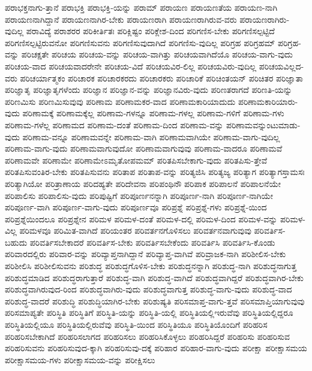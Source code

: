 {ಪರಾಭಕ್ತನಾಗು-ತ್ತಾನೆ
ಪರಾಭಕ್ತಿ
ಪರಾಭಕ್ತಿ-ಯನ್ನು
ಪರಾಮ್
ಪರಾಯಣ
ಪರಾಯಣತೆಯ
ಪರಾಯಣ-ನಾಗಿ
ಪರಾಯಣನಾಗಿದ್ದಾನೆ
ಪರಾಯಣನಾಗಿರ-ಬೇಕು
ಪರಾಯಣರಾಗಿ
ಪರಾಯಣರಾಗಿರುವ-ವರು
ಪರಾಯಣರಾಗಿರು-ವುದಿಲ್ಲ
ಪರಾವಿದ್ಯೆ
ಪರಾಶರರ
ಪರಿಕೀರ್ತಿತಃ
ಪರಿಕ್ಲಿಷ್ಟಂ
ಪರಿಕ್ಲೇಶ-ದಿಂದ
ಪರಿಗಣಿಸ-ಬೇಕು
ಪರಿಗಣಿಸಲ್ಪಟ್ಟಿದೆ
ಪರಿಗಣಿಸಲ್ಪಟ್ಟಿರುವನೋ
ಪರಿಗಣಿಸುವನು
ಪರಿಗಣಿಸುವುದಾಗಿದೆ
ಪರಿಗಣಿಸು-ವುದಿಲ್ಲ
ಪರಿಗ್ರಹ
ಪರಿಗ್ರಹಮ್
ಪರಿಗ್ರಹ-ವನ್ನು
ಪರಿಚಕ್ಷತೇ
ಪರಿಚಯ
ಪರಿಚಯ-ವನ್ನು
ಪರಿಚಯ-ವಾಗಿತ್ತು
ಪರಿಚಯವಾಗಿದೆಯೊ
ಪರಿಚಯ-ವಾಗು-ವುದು
ಪರಿಚಯ-ವಾದ
ಪರಿಚಯವಾದರೇನೇ
ಪರಿಚಯ-ವಿದೆ
ಪರಿಚಯವಿರ-ಲಿಲ್ಲ
ಪರಿಚಯವಿರು-ವುದಿಲ್ಲ
ಪರಿಚಯವಿಲ್ಲದ-ವರು
ಪರಿಚರ್ಯಾತ್ಮಕಂ
ಪರಿಚಾರಕ
ಪರಿಚಾರಕರದು
ಪರಿಚಾರಕರು
ಪರಿಚಾರಿಕೆ
ಪರಿಚಿಂತಯನ್
ಪರಿಚಿತರ
ಪರಿಜ್ಞಾತಾ
ಪರಿಜ್ಞಾತೃ
ಪರಿಜ್ಞಾತೃಗಳೆಂದು
ಪರಿಜ್ಞಾನ
ಪರಿಜ್ಞಾನ-ವನ್ನು
ಪರಿಜ್ಞಾನವಿರು-ವುದು
ಪರಿಣತರಾಗದೆ
ಪರಿಣತಿ-ಯನ್ನು
ಪರಿಣಮಿಸು
ಪರಿಣಮಿಸುವುವು
ಪರಿಣಾಮ
ಪರಿಣಾಮಕರ-ವಾದ
ಪರಿಣಾಮಕಾರಿಯಾದುದು
ಪರಿಣಾಮಕಾರಿಯಾರು-ವುದು
ಪರಿಣಾಮಕ್ಕೆ
ಪರಿಣಾಮಕ್ಕೆಲ್ಲ
ಪರಿಣಾಮ-ಗಳನ್ನೂ
ಪರಿಣಾಮ-ಗಳಲ್ಲ
ಪರಿಣಾಮ-ಗಳಿಗೆ
ಪರಿಣಾಮ-ಗಳು
ಪರಿಣಾಮ-ಗಳೆಲ್ಲ
ಪರಿಣಾಮದ
ಪರಿಣಾಮ-ದಂತೆ
ಪರಿಣಾಮ-ದಿಂದ
ಪರಿಣಾಮ-ವನ್ನು
ಪರಿಣಾಮವನ್ನುಂಟುಮಾಡು-ವುದು
ಪರಿಣಾಮ-ವನ್ನೂ
ಪರಿಣಾಮವನ್ನೇ
ಪರಿಣಾಮ-ವಾಗಿ
ಪರಿಣಾಮವಾಗಿಯೇ
ಪರಿಣಾಮ-ವಾಗು-ವುದಿಲ್ಲ
ಪರಿಣಾಮ-ವಾಗು-ವುದು
ಪರಿಣಾಮವಾಗುವುದೋ
ಪರಿಣಾಮವಾಗುವುವು
ಪರಿಣಾಮ-ವಾದರೂ
ಪರಿಣಾಮವೆ
ಪರಿಣಾಮವೇ
ಪರಿಣಾಮೇ
ಪರಿಣಾಮೇಽಮೃತೋಪಮಮ್
ಪರಿತಪಿಸಬೇಕಾಗು-ವುದು
ಪರಿತಪಿಸು-ತ್ತೇವೆ
ಪರಿತಪಿಸುವಂತಿರ-ಬೇಕು
ಪರಿತಪಿಸುವನು
ಪರಿತಾಪ
ಪರಿತಾಪ-ವನ್ನು
ಪರಿತ್ಯಜಿಸಿ
ಪರಿತ್ಯಜ್ಯ
ಪರಿತ್ಯಾಗ
ಪರಿತ್ಯಾಗಸ್ತಾಮಸಃ
ಪರಿತ್ಯಾಗಿಯೋ
ಪರಿತ್ರಾಣಾಯ
ಪರಿದಹ್ಯತೇ
ಪರಿದೇವನಾ
ಪರಿಪಂಥಿನೌ
ಪರಿಪಾಕ
ಪರಿಪಾಲನೆ
ಪರಿಪಾಲನೆಯೇ
ಪರಿಪಾಲಿಸು
ಪರಿಪಾಲಿಸು-ವುದು
ಪರಿಪುಷ್ಟಿಗೆ
ಪರಿಪೂರ್ಣನನ್ನಾಗಿ
ಪರಿಪೂರ್ಣ-ನಾಗಿ
ಪರಿಪೂರ್ಣ-ನಾಗಿಯೇ
ಪರಿಪೂರ್ಣ-ವಾಗಿ
ಪರಿಪೂರ್ಣ-ವಾಗು-ವುದು
ಪರಿಪೂರ್ಣವೂ
ಪರಿಪ್ರಶ್ನೆ
ಪರಿಪ್ರಶ್ನೆ-ಗಳು
ಪರಿಪ್ರಶ್ನೆ-ಯಿಂದ
ಪರಿಪ್ರಶ್ನೆಯಿಂದಲೂ
ಪರಿಪ್ರಶ್ನೇನ
ಪರಿಮಳ
ಪರಿಮಳ-ದಂತೆ
ಪರಿಮಳ-ದಲ್ಲಿ
ಪರಿಮಳ-ದಿಂದ
ಪರಿಮಳ-ವನ್ನು
ಪರಿಮಳ-ವಿಲ್ಲ
ಪರಿಮಳವೂ
ಪರಿಮಿತ-ವಾಗಿದೆ
ಪರಿಯಂತರ
ಪರಿವರ್ತನಗೊಳಿಸಲು
ಪರಿವರ್ತನವಾಗುವುವು
ಪರಿವರ್ತಿಸ-ಬಹುದು
ಪರಿವರ್ತಿಸಬೇಕಾದರೆ
ಪರಿವರ್ತಿಸ-ಬೇಕು
ಪರಿವರ್ತಿಸಬೇಕೆಂದು
ಪರಿವರ್ತಿಸಿ
ಪರಿವರ್ತಿಸಿ-ಕೊಂಡು
ಪರಿವಾರದಲ್ಲಿರು
ಪರಿವಾರ-ವನ್ನು
ಪರಿವ್ಯಾಪ್ತನಾಗಿದ್ದಾನೆ
ಪರಿವ್ಯಾಪ್ತ-ವಾಗಿವೆ
ಪರಿವ್ರಾಜಕ-ನಾಗಿ
ಪರಿಶೀಲಿಸ-ಬೇಕು
ಪರಿಶೀಲಿಸಿ
ಪರಿಶೀಲಿಸುವನು
ಪರಿಶುದ್ಧ
ಪರಿಶುದ್ಧಗೊಳಿಸ-ಬೇಕು
ಪರಿಶುದ್ಧನನ್ನಾಗಿ
ಪರಿಶುದ್ಧ-ನಾಗಿ
ಪರಿಶುದ್ಧನಾಗುತ್ತ
ಪರಿಶುದ್ಧಮಾಡಿದ
ಪರಿಶುದ್ಧರಾಗುತ್ತಾರೆ
ಪರಿಶುದ್ಧ-ವಾಗಿ
ಪರಿಶುದ್ಧ-ವಾಗಿದೆ
ಪರಿಶುದ್ಧವಾಗಿದ್ದರೆ
ಪರಿಶುದ್ಧವಾಗಿರ-ಬೇಕು
ಪರಿಶುದ್ಧವಾಗಿರುವುದ-ರಿಂದ
ಪರಿಶುದ್ಧವಾಗಿರು-ವುದು
ಪರಿಶುದ್ಧವಾಗುತ್ತ
ಪರಿಶುದ್ಧ-ವಾಗು-ವುದು
ಪರಿಶುದ್ಧ-ವಾದ
ಪರಿಶುದ್ಧ-ವಾದರೆ
ಪರಿಶುದ್ಧಿ
ಪರಿಶುದ್ಧಿಯಾಗಿರ-ಬೇಕು
ಪರಿಶುಷ್ಯತಿ
ಪರಿಸಮಾಪ್ತ-ವಾಗು-ತ್ತವೆ
ಪರಿಸಮಾಪ್ತಿಯಾಗುವುವು
ಪರಿಸಮಾಪ್ಯತೇ
ಪರಿಸ್ಥಿತಿ
ಪರಿಸ್ಥಿತಿಗೆ
ಪರಿಸ್ಥಿತಿ-ಯನ್ನು
ಪರಿಸ್ಥಿತಿ-ಯಲ್ಲಿ
ಪರಿಸ್ಥಿತಿಯಲ್ಲಿಇರುವೆವು
ಪರಿಸ್ಥಿತಿಯಲ್ಲಿದ್ದರೂ
ಪರಿಸ್ಥಿತಿಯಲ್ಲಿಯೂ
ಪರಿಸ್ಥಿತಿಯಲ್ಲಿರುವೆವು
ಪರಿಸ್ಥಿತಿ-ಯಿಂದ
ಪರಿಸ್ಥಿತಿಯೂ
ಪರಿಸ್ಥಿತಿಯೊಂದಿಗೆ
ಪರಿಹರಿಸ
ಪರಿಹರಿಸಬೇಕಾಗಿದೆ
ಪರಿಹರಿಸಲಾಗದ
ಪರಿಹರಿಸಲು
ಪರಿಹರಿಸಿಕೊಳ್ಳಲು
ಪರಿಹರಿಸಿದ್ದರೆ
ಪರಿಹರಿಸು
ಪರಿಹರಿಸುವ
ಪರಿಹರಿಸುವನು
ಪರಿಹರಿಸುವುದ-ಕ್ಕಾಗಿ
ಪರಿಹರಿಸುವು-ದಕ್ಕೆ
ಪರಿಹಾರ
ಪರಿಹಾರ-ವಾಗು-ವುದು
ಪರೀಕ್ಷಾ
ಪರೀಕ್ಷಾಸಮಯ
ಪರೀಕ್ಷಾಸಮಯ-ಗಳು
ಪರೀಕ್ಷಾಸಮಯ-ವನ್ನು
ಪರೀಕ್ಷಿಸಲು
}
